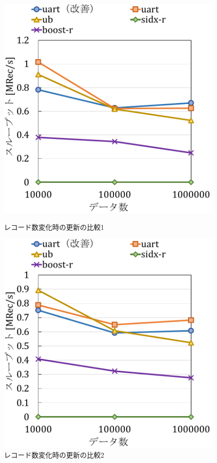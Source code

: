 \begin{figure}[tb]
  \begin{minipage}[c]{0.495\textwidth}
    \centering
    \includegraphics[scale=0.5]{./figures/graph-record-update-2-0.pdf}
    \caption{レコード数変化時の更新の比較1}
    \label{graph:rec-upd-2-0}
  \end{minipage}
  \begin{minipage}[c]{0.495\textwidth}
    \centering
    \includegraphics[scale=0.5]{./figures/graph-record-update-2-0.5.pdf}
    \caption{レコード数変化時の更新の比較2}
    \label{graph:rec-upd-2-0.5}
  \end{minipage}
\end{figure}
